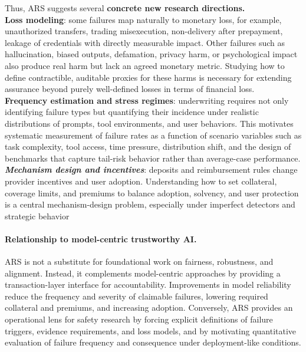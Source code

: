 \documentclass{article} %
\begin{document}
Thus, \textsc{ARS} suggests several \textbf{concrete new research directions.}\\ 
\textbf{Loss modeling}: some failures map naturally to monetary loss, for example, unauthorized transfers, trading misexecution, non-delivery after prepayment, leakage of credentials with directly measurable impact. Other failures such as hallucination, biased outputs, defamation, privacy harm, or psychological impact also produce real harm but lack an agreed monetary metric. Studying how to define contractible, auditable proxies for these harms is necessary for extending assurance beyond purely well-defined losses in terms of financial loss.\\
\textbf{Frequency estimation and stress regimes}: underwriting requires not only identifying failure types but quantifying their incidence under realistic distributions of prompts, tool environments, and user behaviors. This motivates systematic measurement of failure rates as a function of scenario variables such as task complexity, tool access, time pressure, distribution shift, and the design of benchmarks that capture tail-risk behavior rather than average-case performance.\\
\textbf\emph{Mechanism design and incentives}: deposits and reimbursement rules change provider incentives and user adoption. Understanding how to set collateral, coverage limits, and premiums to balance adoption, solvency, and user protection is a central mechanism-design problem, especially under imperfect detectors and strategic behavior 

\paragraph{Relationship to model-centric trustworthy AI.}
\textsc{ARS} is not a substitute for foundational work on fairness, robustness, and alignment. Instead, it complements model-centric approaches by providing a transaction-layer interface for accountability. Improvements in model reliability reduce the frequency and severity of claimable failures, lowering required collateral and premiums, and increasing adoption. Conversely, \textsc{ARS} provides an operational lens for safety research by forcing explicit definitions of failure triggers, evidence requirements, and loss models, and by motivating quantitative evaluation of failure frequency and consequence under deployment-like conditions.
\end{document}
